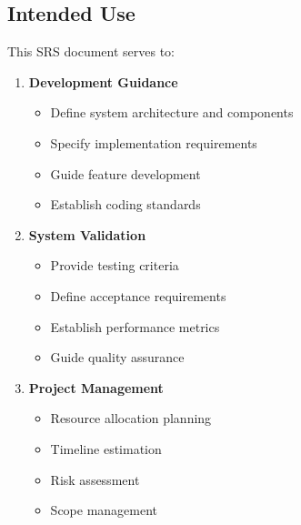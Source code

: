 \subsection{Intended Use}
This SRS document serves to:
\begin{enumerate}
    \item \textbf{Development Guidance}
    \begin{itemize}
        \item Define system architecture and components
        \item Specify implementation requirements
        \item Guide feature development
        \item Establish coding standards
    \end{itemize}

    \item \textbf{System Validation}
    \begin{itemize}
        \item Provide testing criteria
        \item Define acceptance requirements
        \item Establish performance metrics
        \item Guide quality assurance
    \end{itemize}

    \item \textbf{Project Management}
    \begin{itemize}
        \item Resource allocation planning
        \item Timeline estimation
        \item Risk assessment
        \item Scope management
    \end{itemize}
\end{enumerate} 